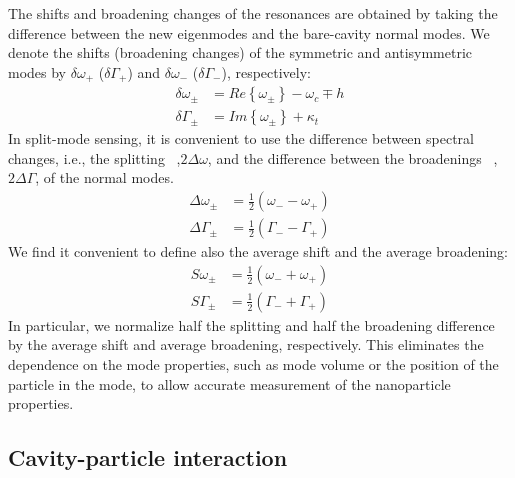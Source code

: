 \documentclass[journal=jacsat,manuscript=article]{achemso}
\begin{document}
The shifts and broadening changes of the resonances are obtained by taking the difference between the new eigenmodes and the bare-cavity normal modes. We denote the shifts (broadening changes) of the symmetric and antisymmetric modes by $\delta \omega_+$ ($\delta \Gamma_+$) and $\delta \omega_-$ ($\delta \Gamma_-$), respectively:
\begin{equation}
\begin{split}
\delta \omega_{\pm} &= Re \left\{ \omega_{\pm} \right\} - \omega_c \mp h \\
\delta \Gamma_{\pm} &= Im \left\{ \omega_{\pm} \right\} + \kappa_t
\end{split}
\label{eq:splitting_broadening}
\end{equation}
In split-mode sensing, it is convenient to use the difference between spectral changes, i.e., the splitting~\cite{zhu2010} ,$2 \Delta \omega$, and the difference between the broadenings~\cite{shao2013detection} ,$2 \Delta \Gamma$, of the normal modes.
\begin{equation}
\begin{split}
\Delta \omega_{\pm} &= \frac{1}{2} \left( \omega_{-} - \omega_{+} \right)\\
\Delta \Gamma_{\pm} &= \frac{1}{2} \left( \Gamma_{-} - \Gamma_{+} \right)
\end{split}
\end{equation}
We find it convenient to define also the average shift and the average broadening:
\begin{equation}
\begin{split}
S \omega_{\pm} &= \frac{1}{2} \left( \omega_{-} + \omega_{+} \right)\\
S \Gamma_{\pm} &= \frac{1}{2} \left( \Gamma_{-} + \Gamma_{+} \right)
\end{split}
\end{equation}
In particular, we normalize half the splitting and half the broadening difference by the average shift and average broadening, respectively. This eliminates the dependence on the mode properties, such as mode volume or the position of the particle in the mode, to allow accurate measurement of the nanoparticle properties.

\subsection{Cavity-particle interaction}
\end{document}
